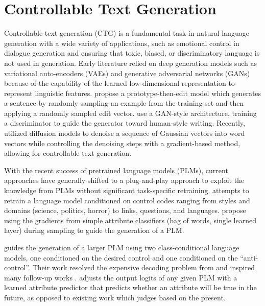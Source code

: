 \section{Controllable Text Generation}
\label{rel:control}

Controllable text generation (CTG) is a fundamental task in natural language generation with a wide variety of applications, such as emotional control in dialogue generation and ensuring that toxic, biased, or discriminatory language is not used in generation. Early literature relied on deep generation models such as variational auto-encoders (VAEs) \citep{guu2018generating, xu2020variational, wang2019topic} and generative adversarial networks (GANs) \citep{scialom2020discriminative} because of the capability of the learned low-dimensional representation to represent linguistic features. \citet{guu2018generating} propose a prototype-then-edit model which generates a sentence by randomly sampling an example from the training set and then applying a randomly sampled edit vector. \citet{scialom2020discriminative} use a GAN-style architecture, training a discriminator to guide the generator toward human-style writing. Recently, \citet{li2022diffusion} utilized diffusion models to denoise a sequence of Gaussian vectors into word vectors while controlling the denoising steps with a gradient-based method, allowing for controllable text generation.

With the recent success of pretrained language models (PLMs), current approaches have generally shifted to a plug-and-play approach to exploit the knowledge from PLMs without significant task-specific retraining. \citet{keskar2019ctrl} attempts to retrain a language model conditioned on control codes ranging from styles and domains (\eg science, politics, horror) to links, questions, and languages. \citet{Dathathri2020Plug} propose using the gradients from simple attribute classifiers (\eg bag of words, single learned layer) during sampling to guide the generation of a PLM. 

\citet{krause2020gedi} guides the generation of a larger PLM using two class-conditional language models, one conditioned on the desired control and one conditioned on the ``anti-control''. Their work resolved the expensive decoding problem from \citet{scialom2020discriminative} and inspired many follow-up works \citep{yang2021fudge, liu-etal-2021-dexperts}. \citet{yang2021fudge} adjusts the output logits of any given PLM with a learned attribute predictor that predicts whether an attribute will be true in the future, as opposed to existing work which judges based on the present. 


